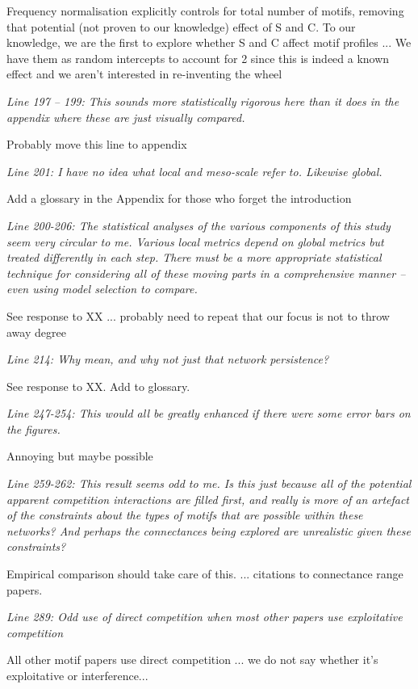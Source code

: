 \documentclass[12pt]{article}
\newcommand{\us}{\rm \setlength{\leftskip}{0.3cm} \setlength{\rightskip}{0.3cm}}
\newcommand{\them}{\it \setlength{\leftskip}{0cm} \setlength{\rightskip}{0cm}}
\begin{document}
\us Frequency normalisation explicitly controls for total number of motifs, removing that potential (not proven to our knowledge) effect of S and C. To our knowledge, we are the first to explore whether S and C affect motif profiles ... 
We have them as random intercepts to account for 2 since this is indeed a known effect and we aren't interested in re-inventing the wheel

\them
Line 197 – 199: This sounds more statistically rigorous here than it does in the appendix where these are just visually compared.

\us Probably move this line to appendix

\them
Line 201: I have no idea what local and meso-scale refer to. Likewise global.

\us Add a glossary in the Appendix for those who forget the introduction

\them
Line 200-206: The statistical analyses of the various components of this study seem very circular to me. Various local metrics depend on global metrics but treated differently in each step. There must be a more appropriate statistical technique for considering all of these moving parts in a comprehensive manner – even using model selection to compare.

\us See response to XX ... probably need to repeat that our focus is not to throw away degree

\them
Line 214: Why mean, and why not just that network persistence?

\us See response to XX. Add to glossary.

\them
Line 247-254: This would all be greatly enhanced if there were some error bars on the figures.

\us Annoying but maybe possible

\them
Line 259-262: This result seems odd to me. Is this just because all of the potential apparent competition interactions are filled first, and really is more of an artefact of the constraints about the types of motifs that are possible within these networks? And perhaps the connectances being explored are unrealistic given these constraints?

\us Empirical comparison should take care of this. ... citations to connectance range papers.

\them
Line 289: Odd use of direct competition when most other papers use exploitative competition

\us All other motif papers use direct competition ... we do not say whether it's exploitative or interference...
\end{document}
